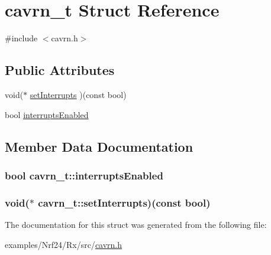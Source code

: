 \hypertarget{structcavrn__t}{}\section{cavrn\+\_\+t Struct Reference}
\label{structcavrn__t}


{\ttfamily \#include $<$cavrn.\+h$>$}

\subsection*{Public Attributes}
\begin{DoxyCompactItemize}
\item 
void($\ast$ \hyperlink{structcavrn__t_a0d00188fb0b8d59a4d7f4be38d56ff52}{set\+Interrupts} )(const bool)
\item 
bool \hyperlink{structcavrn__t_afe63f8114e4661a212dda80f63c4ad23}{interrupts\+Enabled}
\end{DoxyCompactItemize}


\subsection{Member Data Documentation}
\hypertarget{structcavrn__t_afe63f8114e4661a212dda80f63c4ad23}{}
\subsubsection[{interrupts\+Enabled}]{\setlength{\rightskip}{0pt plus 5cm}bool cavrn\+\_\+t\+::interrupts\+Enabled}\label{structcavrn__t_afe63f8114e4661a212dda80f63c4ad23}
\hypertarget{structcavrn__t_a0d00188fb0b8d59a4d7f4be38d56ff52}{}
\subsubsection[{set\+Interrupts}]{\setlength{\rightskip}{0pt plus 5cm}void($\ast$ cavrn\+\_\+t\+::set\+Interrupts)(const bool)}\label{structcavrn__t_a0d00188fb0b8d59a4d7f4be38d56ff52}


The documentation for this struct was generated from the following file\+:\begin{DoxyCompactItemize}
\item 
examples/\+Nrf24/\+Rx/src/\hyperlink{examples_2Nrf24_2Rx_2src_2cavrn_8h}{cavrn.\+h}\end{DoxyCompactItemize}
